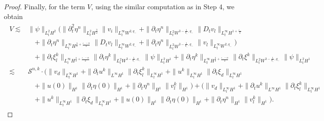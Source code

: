 \documentclass[letterpaper,reqno,10pt,twoside]{amsart}
\theoremstyle{definition}
\theoremstyle{remark}
\def\p{\partial}
\begin{document}
\begin{proof}
		Finally, for the term $V$, using the similar computation as in Step 4, we obtain
		\begin{align}\label{est:dtu_m2}
			\begin{aligned}
				V\lesssim& \|\psi\|_{L_{t}^{2}H^{2}}\Big(\|\p_{t}^{2}{\eta}^{n}\|_{L_{t}^{2}H^{\frac{3}{2}}}\|v_{i}\|_{L_{t}^{\infty}W^{2,q_{-}}}+\|\p_{t}{\eta}^{n}\|_{L_{t}^{2}W^{3-\frac{1}{q_{-}},q_{-}}}\|D_{t}v_{l}\|_{L_{t}^{\infty}H^{1+\frac{\varepsilon_{-}}{2}}}\\
				&\quad+\|\p_{t}\eta^{n}\|_{L_{t}^{\infty}H^{\frac{3}{2}+\frac{\varepsilon_{-}-\alpha}{2}}}\|D_{t}v_{l}\|_{L_{t}^{\infty}W^{2,q_{-}}}+\|\p_{t}{\eta}^{n}\|_{L_{t}^{2}W^{3-\frac{1}{q_{-}},q_{-}}}\|v_{l}\|_{L_{t}^{\infty}W^{2,q_{-}}}\Big)\\
				&\quad+\|\p_{t}\xi_{l}^{k}\|_{L_{t}^{\infty}H^{\frac{3}{2}+\frac{\varepsilon_{-}-\alpha}{2}}}\|\p_{t}\eta^{k}\|_{L_{t}^{2}W^{3-\frac{1}{q_{-}},q_{-}}}\|\psi\|_{L_{t}^{2}H^{1}}+\|\p_{t}\eta^{k}\|_{L_{t}^{\infty}H^{\frac{3}{2}+\frac{\varepsilon_{-}-\alpha}{2}}}\|\p_{t}\xi^{k}\|_{L_{t}^{2}W^{3-\frac{1}{q_{-}},q_{-}}}\|\psi\|_{L_{t}^{2}H^{1}}\\
				\lesssim&\mathscr{S}^{n,k}\cdot \Big(\|v_{d}\|_{L_{t}^{\infty}H^{1}}+\|\p_{t}u^{k}\|_{L^{\infty}H^{1}}\|\p_{t}\xi_{l}^{k}\|_{L_{t}^{\infty}H^{1}}+\|u^{k}\|_{L_{t}^{\infty}H^{1}}\|\p_{t}\xi_{d}\|_{L_{t}^{\infty}H^{1}}\\
				&\quad+\|u(0)\|_{H^{1}}\|\p_{t}\eta(0)\|_{H^{1}}+\|\p_{t}\eta^{n}\|_{H^{1}}\|v_{l}^{k}\|_{H^{1}}\Big)+\big(\|v_{d}\|_{L_{t}^{\infty}H^{1}}+\|\p_{t}u^{k}\|_{L^{\infty}H^{1}}\|\p_{t}\xi_{l}^{k}\|_{L_{t}^{\infty}H^{1}}\\
				&\quad+\|u^{k}\|_{L_{t}^{\infty}H^{1}}\|\p_{t}\xi_{d}\|_{L_{t}^{\infty}H^{1}}+\|u(0)\|_{H^{1}}\|\p_{t}\eta(0)\|_{H^{1}}+\|\p_{t}\eta^{n}\|_{H^{1}}\|v_{l}^{k}\|_{H^{1}}\big).
			\end{aligned}
		\end{align}
		

\end{proof}
\end{document}
